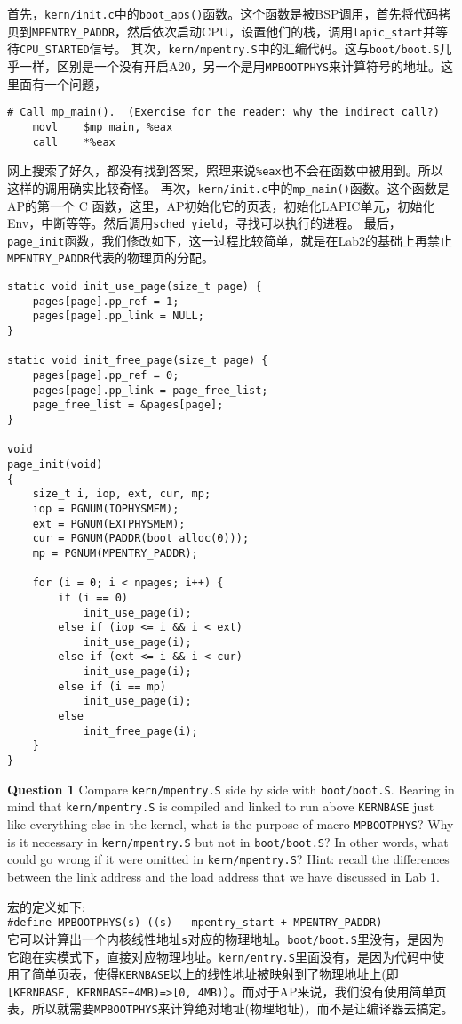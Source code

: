 \documentclass[11pt]{article}
\begin{document}
首先，\lstinline|kern/init.c|中的\lstinline|boot_aps()|函数。这个函数是被BSP调用，首先将代码拷贝到\lstinline|MPENTRY_PADDR|，然后依次启动CPU，设置他们的栈，调用\lstinline|lapic_start|并等待\lstinline|CPU_STARTED|信号。
其次，\lstinline|kern/mpentry.S|中的汇编代码。这与\lstinline|boot/boot.S|几乎一样，区别是一个没有开启A20，另一个是用\lstinline|MPBOOTPHYS|来计算符号的地址。这里面有一个问题，
\begin{lstlisting}[title=kern/mpentry.S]
	# Call mp_main().  (Exercise for the reader: why the indirect call?)
	movl    $mp_main, %eax
	call    *%eax
\end{lstlisting}
网上搜索了好久，都没有找到答案，照理来说\lstinline|%eax|也不会在函数中被用到。所以这样的调用确实比较奇怪。
再次，\lstinline|kern/init.c|中的\lstinline|mp_main()|函数。这个函数是AP的第一个 C 函数，这里，AP初始化它的页表，初始化LAPIC单元，初始化Env，中断等等。然后调用\lstinline|sched_yield|，寻找可以执行的进程。
最后，\lstinline|page_init|函数，我们修改如下，这一过程比较简单，就是在Lab2的基础上再禁止\lstinline|MPENTRY_PADDR|代表的物理页的分配。
\begin{lstlisting}[title=kern/pmap.c]
static void init_use_page(size_t page) {
	pages[page].pp_ref = 1;
	pages[page].pp_link = NULL;
}

static void init_free_page(size_t page) {
	pages[page].pp_ref = 0;
	pages[page].pp_link = page_free_list;
	page_free_list = &pages[page];
}

void
page_init(void)
{
	size_t i, iop, ext, cur, mp;
	iop = PGNUM(IOPHYSMEM);
	ext = PGNUM(EXTPHYSMEM);
	cur = PGNUM(PADDR(boot_alloc(0)));
	mp = PGNUM(MPENTRY_PADDR);

	for (i = 0; i < npages; i++) {
		if (i == 0)
			init_use_page(i);
		else if (iop <= i && i < ext)
			init_use_page(i);
		else if (ext <= i && i < cur)
			init_use_page(i);
		else if (i == mp)
			init_use_page(i);
		else
			init_free_page(i);
	}
}
\end{lstlisting}
\begin{framed}
\noindent\textbf{Question 1} Compare \lstinline|kern/mpentry.S| side by side with \lstinline|boot/boot.S|. Bearing in mind that \lstinline|kern/mpentry.S| is compiled and linked to run above \lstinline|KERNBASE| just like everything else in the kernel, what is the purpose of macro \lstinline|MPBOOTPHYS|? Why is it necessary in \lstinline|kern/mpentry.S| but not in \lstinline|boot/boot.S|? In other words, what could go wrong if it were omitted in \lstinline|kern/mpentry.S|? 
Hint: recall the differences between the link address and the load address that we have discussed in Lab 1.
\end{framed}
宏的定义如下: \\
\lstinline|#define MPBOOTPHYS(s) ((s) - mpentry_start + MPENTRY_PADDR)| \\ 
它可以计算出一个内核线性地址\lstinline|s|对应的物理地址。\lstinline|boot/boot.S|里没有，是因为它跑在实模式下，直接对应物理地址。\lstinline|kern/entry.S|里面没有，是因为代码中使用了简单页表，使得\lstinline|KERNBASE|以上的线性地址被映射到了物理地址上(即\lstinline|[KERNBASE, KERNBASE+4MB)=>[0, 4MB)|）。而对于AP来说，我们没有使用简单页表，所以就需要\lstinline|MPBOOTPHYS|来计算绝对地址(物理地址)，而不是让编译器去搞定。
\end{document}
